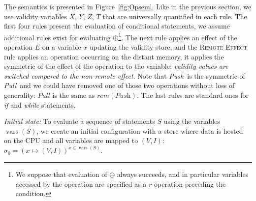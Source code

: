 \documentclass[preprint,12pt]{elsarticle}
\newcommand{\symb}[1]{\textit{#1}}
\newcommand{\Push}{\symb{Push}}
\newcommand{\Pull}{\symb{Pull}}
\DeclareMathOperator{\vars}{vars}
\newcommand{\rem}[1]{\symb{rem}(#1)}
\begin{document}
The semantics is presented in Figure~\ref{fig:Opsem}. Like in the previous section, we 
use validity variables $X$, $Y$, $Z$, $T$ 
that are universally quantified in each rule.
 The first %
 four rules present the 
evaluation of conditional statements, we assume additional rules exist for evaluating 
$\oplus$\footnote{We  suppose  that evaluation of $\oplus$ always succeeds, and in particular  variables accessed by the operation are specified as a $r$ operation preceding the condition.}. The next rule applies an effect of the operation $E$ on a variable $x$ updating the validity store, 
and the \textsc{Remote Effect} rule applies an operation occurring on the distant memory, it 
applies the symmetric of the effect of the operation to the variable: \emph{validity values are switched compared to the non-remote effect}. Note that \Push\ is the symmetric of 
\Pull\ and we could have removed one of those two operations without loss of generality: $\Pull$ is the same as $\rem \Push$. 
The last rules are standard ones for \symb{if} and \symb{while} statements.

\noindent\emph{Initial state:} To evaluate a sequence of statements $S$ using the 
variables 
$\vars(S)$, we create an initial configuration with 
a store where data is hosted on the CPU and all variables are  mapped to $(V,I)$: 
$\sigma_0=(x\mapsto 
(V,I))^{x\in \vars(S)}$.


\end{document}
